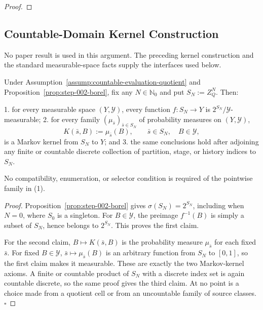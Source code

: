\begin{proof}
\end{proof}

\subsection{Countable-Domain Kernel Construction}\label{app:step_003}


No paper result is used in this argument. The preceding kernel construction and
the standard measurable-space facts supply the interfaces used below.

 \begin{lemma}\label{lem:step-003-countable-promotion}
Under Assumption~\ref{assump:countable-evaluation-quotient} and Proposition~\ref{prop:step-002-borel}, fix any
\(N\in\mathbb N_0\) and put \(S_N:=Z_Q^N\). Then:

1. for every measurable space \((Y,\mathcal Y)\), every function
   \(f:S_N\to Y\) is \(2^{S_N}/\mathcal Y\)-measurable;
2. for every family \((\mu_{\bar s})_{\bar s\in S_N}\) of probability
   measures on \((Y,\mathcal Y)\),
   \[
   K(\bar s,B):=\mu_{\bar s}(B),
   \qquad \bar s\in S_N,\quad B\in\mathcal Y,
   \tag{1}
   \]
   is a Markov kernel from \(S_N\) to \(Y\); and
3. the same conclusions hold after adjoining any finite or countable
   discrete collection of partition, stage, or history indices to \(S_N\).

No compatibility, enumeration, or selector condition is required of the
pointwise family in (1).


\end{lemma}

\begin{proof}
Proposition~\ref{prop:step-002-borel} gives
\(\sigma(S_N)=2^{S_N}\), including when \(N=0\), where \(S_0\) is a
singleton. For \(B\in\mathcal Y\), the preimage \(f^{-1}(B)\) is simply a
subset of \(S_N\), hence belongs to \(2^{S_N}\). This proves the first
claim.

For the second claim, \(B\mapsto K(\bar s,B)\) is the probability measure
\(\mu_{\bar s}\) for each fixed \(\bar s\). For fixed \(B\in\mathcal Y\),
\(\bar s\mapsto\mu_{\bar s}(B)\) is an arbitrary function from \(S_N\) to
\([0,1]\), so the first claim makes it measurable. These are exactly the two
Markov-kernel axioms. A finite or countable product of \(S_N\) with a
discrete index set is again countable discrete, so the same proof gives the
third claim. At no point is a choice made from a quotient cell or from an
uncountable family of source classes. \(\square\)


\end{proof}

